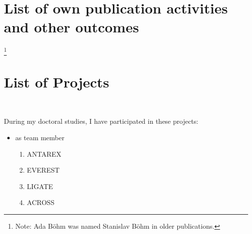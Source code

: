 \chapter*{List of own publication activities and other outcomes}
\label{ch:listofstudentsownpublicationactivitiesandotheroutcomes}

\begin{refsection}
	\nocite{rsds, estee, ligate}
	\printbibliography[heading=subbibintoc, title={Publications Related to Thesis}]
\end{refsection}

\footnote{Note: Ada Böhm was named Stanislav Böhm in older publications.}

\begin{refsection}
	\nocite{spin, spin2, graphminesuite, sisa, smi, haydi,
	traffic_simulator_1, traffic_simulator_2}
	\printbibliography[heading=subbibintoc, title={Publications Not Related to Thesis}]
\end{refsection}

\chapter*{List of Projects}
\label{ch:listofprojects}~
During my doctoral studies, I have participated in these projects:
\begin{itemize}
	\item as team member
	      \begin{enumerate}
		      \item ANTAREX
		      \item EVEREST
		      \item LIGATE
		      \item ACROSS
	      \end{enumerate}
\end{itemize}

\printbibliography[heading=subbibintoc, title={References}]
